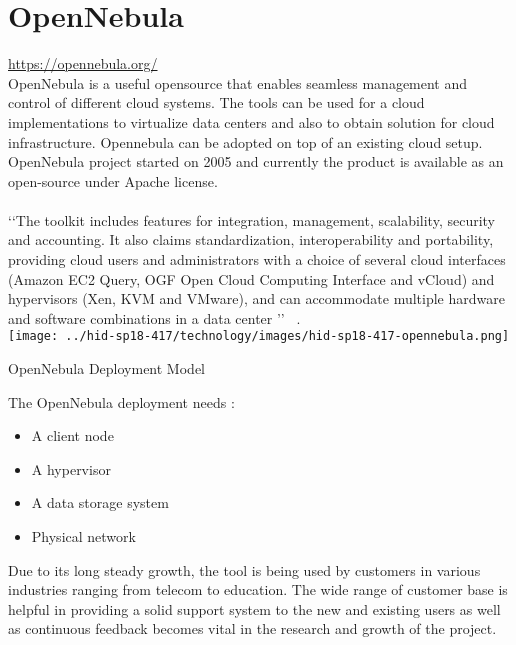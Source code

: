 
\section{OpenNebula}
\url{https://opennebula.org/} \\ 
   
OpenNebula is a useful opensource that enables seamless management and control of different cloud systems.
The tools can be used for a cloud implementations 
to virtualize data centers and also to obtain solution for cloud infrastructure.
Opennebula can be adopted on top of an existing cloud setup.
OpenNebula project started on 2005 and currently the product is available as an open-source under Apache license. \\
\\
‘‘The toolkit includes features for integration, management, scalability, security and accounting.
It also claims standardization, interoperability and portability, providing cloud users and administrators with a choice of several
cloud interfaces (Amazon EC2 Query, OGF Open Cloud Computing Interface and vCloud) and hypervisors
(Xen, KVM and VMware), and can accommodate multiple hardware and software combinations in a data center ’’
~\cite{hid-sp18-417-opennebula-wiki}.\\

\texttt{[image: ../hid-sp18-417/technology/images/hid-sp18-417-opennebula.png]}


\begin{center}
OpenNebula Deployment Model ~\cite{hid-sp18-417-opennebula-deployment} 
\end{center}

The OpenNebula deployment needs :
\begin{itemize}
\item        A client node
\item        A hypervisor
\item        A data storage system
\item        Physical network
\end{itemize}

Due to its long steady growth, the tool is being used by customers in various industries ranging from telecom to education.
The wide range of customer base is helpful in providing a solid support system to the new and existing users as well as continuous
feedback becomes vital in the research and growth of the project. 

